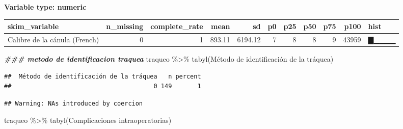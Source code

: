 \documentclass[
]{article}
\newenvironment{Shaded}{\begin{snugshade}}{\end{snugshade}}
\newcommand{\AttributeTok}[1]{\textcolor[rgb]{0.77,0.63,0.00}{#1}}
\newcommand{\DocumentationTok}[1]{\textcolor[rgb]{0.56,0.35,0.01}{\textbf{\textit{#1}}}}
\newcommand{\FunctionTok}[1]{\textcolor[rgb]{0.00,0.00,0.00}{#1}}
\newcommand{\NormalTok}[1]{#1}
\newcommand{\OtherTok}[1]{\textcolor[rgb]{0.56,0.35,0.01}{#1}}
\newcommand{\SpecialCharTok}[1]{\textcolor[rgb]{0.00,0.00,0.00}{#1}}
\newcommand{\StringTok}[1]{\textcolor[rgb]{0.31,0.60,0.02}{#1}}
\begin{document}
\textbf{Variable type: numeric}

\begin{longtable}[]{@{}lrrrrrrrrrl@{}}
\toprule
skim\_variable & n\_missing & complete\_rate & mean & sd & p0 & p25 &
p50 & p75 & p100 & hist \\
\midrule
\endhead
Calibre de la cánula (French) & 0 & 1 & 893.11 & 6194.12 & 7 & 8 & 8 & 9
& 43959 & ▇▁▁▁▁ \\
\bottomrule
\end{longtable}

\begin{Shaded}
\begin{Highlighting}[]
\DocumentationTok{\#\#\# metodo de identificacion traquea}
\NormalTok{traqueo }\SpecialCharTok{\%\textgreater{}\%}
  \FunctionTok{tabyl}\NormalTok{(}\StringTok{\textasciigrave{}}\AttributeTok{Método de identificación de la tráquea}\StringTok{\textasciigrave{}}\NormalTok{)}
\end{Highlighting}
\end{Shaded}

\begin{verbatim}
##  Método de identificación de la tráquea   n percent
##                                       0 149       1
\end{verbatim}

\begin{Shaded}
\end{Shaded}

\begin{verbatim}
## Warning: NAs introduced by coercion
\end{verbatim}

\begin{Shaded}
\begin{Highlighting}[]
\NormalTok{traqueo }\SpecialCharTok{\%\textgreater{}\%}
  \FunctionTok{tabyl}\NormalTok{(}\StringTok{\textasciigrave{}}\AttributeTok{Complicaciones intraoperatorias}\StringTok{\textasciigrave{}}\NormalTok{)}
\end{Highlighting}
\end{Shaded}
\end{document}
